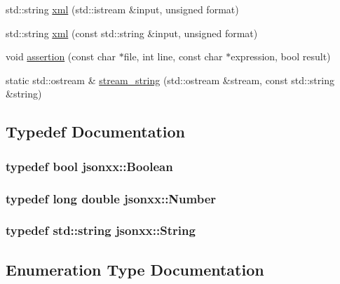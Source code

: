 \begin{DoxyCompactItemize}
std\+::string \hyperlink{namespacejsonxx_a7e3cf6a1148be73eaeac22a3a4e91736}{xml} (std\+::istream \&input, unsigned format)
\item 
std\+::string \hyperlink{namespacejsonxx_ae6d88608c2b772fce33104de7d9b5e2a}{xml} (const std\+::string \&input, unsigned format)
\item 
void \hyperlink{namespacejsonxx_a618a0d9a69323fe8a6ed8e50680ae829}{assertion} (const char $\ast$file, int line, const char $\ast$expression, bool result)
\item 
static std\+::ostream \& \hyperlink{namespacejsonxx_a052e51dfd73ecb2692230a6a971276dc}{stream\+\_\+string} (std\+::ostream \&stream, const std\+::string \&string)
\end{DoxyCompactItemize}


\subsection{Typedef Documentation}
\hypertarget{namespacejsonxx_aa700abaa02dfd30f2a09ba8e95c6f3eb}{}
\subsubsection[{Boolean}]{\setlength{\rightskip}{0pt plus 5cm}typedef bool {\bf jsonxx\+::\+Boolean}}\label{namespacejsonxx_aa700abaa02dfd30f2a09ba8e95c6f3eb}
\hypertarget{namespacejsonxx_a189d79e326066a8e082664e4062f3fc8}{}
\subsubsection[{Number}]{\setlength{\rightskip}{0pt plus 5cm}typedef long double {\bf jsonxx\+::\+Number}}\label{namespacejsonxx_a189d79e326066a8e082664e4062f3fc8}
\hypertarget{namespacejsonxx_a29c7a7494bb75c227bdbd208dc80a09f}{}
\subsubsection[{String}]{\setlength{\rightskip}{0pt plus 5cm}typedef std\+::string {\bf jsonxx\+::\+String}}\label{namespacejsonxx_a29c7a7494bb75c227bdbd208dc80a09f}


\subsection{Enumeration Type Documentation}
\hypertarget{namespacejsonxx_a1dc6d8d59422ab47976163f874939455}{}
